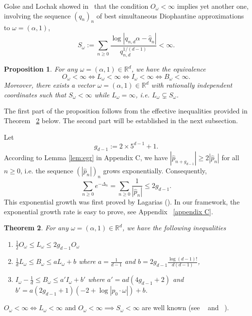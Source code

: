 \documentclass[12pt,reqno,a4paper]{amsart}%
\numberwithin{equation}{section}
\newtheorem{theorem}{Theorem}[section]
\newtheorem{proposition}[theorem]{Proposition}
\newcommand{\Rr}{{\mathbb{R}}}
\begin{document}
Golse and Lochak showed in~\cite{GoLo} that the condition $ O_{\omega}<\infty$ implies yet another one, involving the sequence $(q_n)_n$ of best simultaneous Diophantine approximations to $\omega=(\alpha,1)$,		
	\[
	S_{\omega}:=\sum_{n\geq 0}\frac{\log |q_{n,d}\alpha-\hat q_n|}{q_{n,d}^{1/(d-1)}}<\infty.
	\]
	
\begin{proposition}\label{prop:Br1}
	For any $\omega=(\alpha,1)\in\Rr^d$, we have the equivalence
	\[
	O_{\omega}<\infty\iff L_{\omega}<\infty\iff I_{\omega}<\infty\iff B_{\omega}<\infty. 
	\] 
	Moreover, there exists a vector $\omega=(\alpha,1)\in\Rr^d$ with rationally independent coordinates such that $S_{\omega}<\infty$ while $L_{\omega}=\infty$, i.e. $L_\omega\subsetneq S_\omega$.
\end{proposition}

The first part of the proposition follows from the effective inequalities provided in Theorem~ \ref{prop:Br2} below. The second part will be established  in the next subsection.
  
Let 
$$
g_{d-1}:=2\times 5^{d-1}+1.
$$
According to Lemma \ref{lem:egr} in Appendix C, we  have $|\hat p_{n+g_{d-1}}|\geq 2|\hat p_n|$ for all $n\geq 0$,  i.e. the sequence $(|\hat p_n|)_n$ grows exponentially. 
Consequently,
\begin{equation}\label{sum 1/p_n}
\sum_{n\geq0} e^{-\Delta_n} = \sum_{n\geq0} \frac{1}{|\hat{p}_n|} \leq 2 g_{d-1}.
\end{equation}
This exponential growth  was first proved by Lagarias (\cite{Lag82,lagarias1983}). In our framework, the exponential growth rate is easy to prove, see Appendix ~\ref{appendix C}. 


\begin{theorem}\label{prop:Br2}
	For any $\omega=(\alpha,1)\in\Rr^d$, we have the following inequalities
	\begin{enumerate}
		\item $\frac12 O_{\omega}\leq L_{\omega}\leq 2g_{d-1} O_{\omega}$
		\item $\tfrac1d L_{\omega}\leq B_{\omega}\leq aL_{\omega}+b$ where $a=\frac{1}{d-1}$ and $b=2g_{d-1}\frac{\log(d-1)!}{d(d-1)}$,
		\item $ I_{\omega}-\tfrac1d\leq B_{\omega}\leq a'I_{\omega} +b'$ where $a'=ad(4g_{d-1}+2)$  and  $b'=a(2g_{d-1}+1)(-2+\log|p_0\cdot\omega|)+b$.
	\end{enumerate}	
\end{theorem}	


\begin{remark} $O_{\omega}<\infty\iff L_{\omega}<\infty$ and $O_{\omega}<\infty\implies S_{\omega}<\infty$ are well known (see ~\cite{DiasGaivao2019} and ~\cite{GoLo}).
	\end{remark}
	
\end{document}
